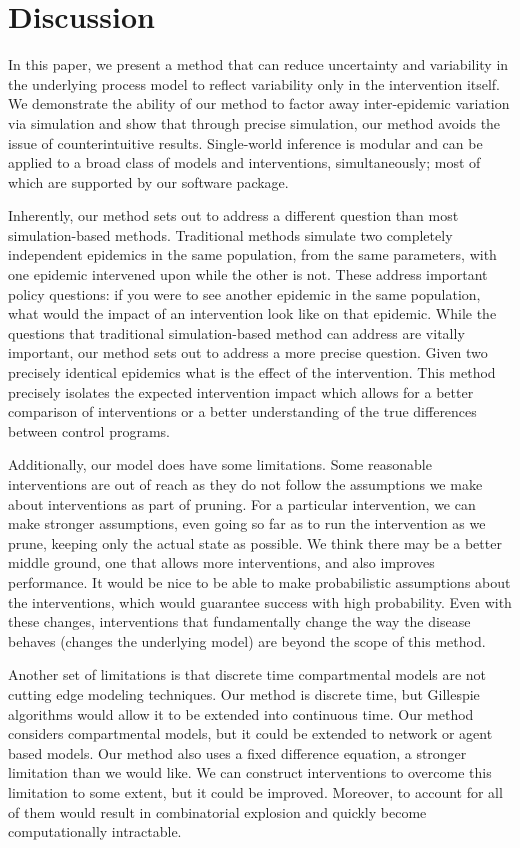 \documentclass[PTRSB]{rsos}
\begin{document}
\section{Discussion}
In this paper, we present a method that can reduce uncertainty and variability in the underlying process model to reflect variability only in the intervention itself.
We demonstrate the ability of our method to factor away inter-epidemic variation via simulation and show that through precise simulation, our method avoids the issue of counterintuitive results. 
Single-world inference is modular and can be applied to a broad class of models and interventions, simultaneously; most of which are supported by our software package.

Inherently, our method sets out to address a different question than most simulation-based methods. 
Traditional methods simulate two completely independent epidemics in the same population, from the same parameters, with one epidemic intervened upon while the other is not. 
These address important policy questions: if you were to see another epidemic in the same population, what would the impact of an intervention look like on that epidemic. 
While the questions that traditional simulation-based method can address are vitally important, our method sets out to address a more precise question. 
Given two precisely identical epidemics what is the effect of the intervention. 
This method precisely isolates the expected intervention impact which allows for a better comparison of interventions or a better understanding of the true differences between control programs.

Additionally, our model does have some limitations.
Some reasonable interventions are out of reach as they do not follow the assumptions we make about interventions as part of pruning.
For a particular intervention, we can make stronger assumptions, even going so far as to run the intervention as we prune, keeping only the actual state as possible.
We think there may be a better middle ground, one that allows more interventions, and also improves performance.
It would be nice to be able to make probabilistic assumptions about the interventions, which would guarantee success with high probability.
Even with these changes, interventions that fundamentally change the way the disease behaves (changes the underlying model) are beyond the scope of this method.

Another set of limitations is that discrete time compartmental models are not cutting edge modeling techniques.
Our method is discrete time, but Gillespie algorithms would allow it to be extended into continuous time.
Our method considers compartmental models, but it could be extended to network or agent based models.
Our method also uses a fixed difference equation, a stronger limitation than we would like.
We can construct interventions to overcome this limitation to some extent, but it could be improved.
Moreover, to account for all of them would result in  combinatorial explosion and quickly become computationally intractable. %
\end{document}
